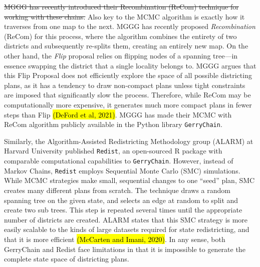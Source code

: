 \documentclass{article}
\begin{document}
\par
\st{MGGG has recently introduced their Recombination (ReCom) technique for working with these chains.} Also key to the MCMC algorithm is exactly how it traverses from one map to the next. MGGG has recently proposed \emph{Recombination} (ReCom) for this process, where the algorithm combines the entirety of two districts and subsequently re-splits them, creating an entirely new map. On the other hand, the \emph{Flip} proposal relies on flipping nodes of a spanning tree—in essence swapping the district that a single locality belongs to.
MGGG argues that this Flip Proposal does not efficiently explore the space of all possible districting plans, as it has a tendency to draw non-compact plans unless tight constraints are imposed that significantly slow the process. Therefore, while ReCom may be computationally more expensive, it generates much more compact plans in fewer steps than Flip \hl{(DeFord et al, 2021)}. MGGG has made their MCMC with ReCom algorithm publicly available in the Python library \lstinline{GerryChain}. 
\par
Similarly, the Algorithm-Assisted Redistricting Methodology group (ALARM) at Harvard University published \lstinline{Redist}, an open-sourced R package with comparable computational capabilities to \lstinline{GerryChain}. However, instead of Markov Chains, \lstinline{Redist} employs Sequential Monte Carlo (SMC) simulations. While MCMC strategies make small, sequential changes to one “seed” plan, SMC creates many different plans from scratch. The technique draws a random spanning tree on the given state, and selects an edge at random to split and create two sub trees. This step is repeated several times until the appropriate number of districts are created. ALARM states that this SMC strategy is more easily scalable to the kinds of large datasets required for state redistricting, and that it is more efficient \hl{(McCarten and Imani, 2020)}. In any sense, both GerryChain and Redist face limitations in that it is impossible to generate the complete state space of districting plans. 
\end{document}
